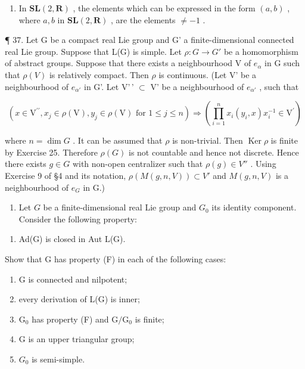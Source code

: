 \begin{enumerate}
\def\labelenumi{\arabic{enumi}.}
\setcounter{enumi}{35}
\tightlist
\item
  In \(\mathbf{SL}(2, \mathbf{R})\) , the elements which can be expressed in the form \((a, b)\) , where \(a, b\) in \(\mathbf{SL}(2, \mathbf{R})\) , are the elements \(\neq -1\) .
\end{enumerate}

¶ 37. Let G be a compact real Lie group and G' a finite-dimensional connected real Lie group. Suppose that L(G) is simple. Let \(\rho: G \to G'\) be a homomorphism of abstract groups. Suppose that there exists a neighbourhood V of \(e_{\alpha}\) in G such that \(\rho(V)\) is relatively compact. Then \(\rho\) is continuous. (Let V' be a neighbourhood of \(e_{\alpha'}\) in G'. Let V'\,' \(\subset\) V' be a neighbourhood of \(e_{\alpha'}\) , such that

\[
(x \in \mathrm{V} ^ {\prime \prime}, x _ {j} \in \rho (\mathrm{V}), y _ {j} \in \rho (\mathrm{V}) \text {   for   } 1 \leqslant j \leqslant n) \Rightarrow \left(\prod_ {i = 1} ^ {n} x _ {i} (y _ {i}, x) x _ {i} ^ {- 1} \in \mathrm{V} ^ {\prime}\right)
\]

where \(n = \dim G\) . It can be assumed that \(\rho\) is non-trivial. Then \(\operatorname{Ker} \rho\) is finite by Exercise 25. Therefore \(\rho(G)\) is not countable and hence not discrete. Hence there exists \(g \in G\) with non-open centralizer such that \(\rho(g) \in V''\) . Using Exercise 9 of §4 and its notation, \(\rho(M(g, n, V)) \subset V'\) and \(M(g, n, V)\) is a neighbourhood of \(e_G\) in G.)

\begin{enumerate}
\def\labelenumi{\arabic{enumi}.}
\setcounter{enumi}{37}
\tightlist
\item
  Let \(G\) be a finite-dimensional real Lie group and \(G_0\) its identity component. Consider the following property:
\end{enumerate}

\begin{enumerate}
\def\labelenumi{(\Alph{enumi})}
\setcounter{enumi}{5}
\tightlist
\item
  Ad(G) is closed in Aut L(G).
\end{enumerate}

Show that G has property (F) in each of the following cases:

\begin{enumerate}
\def\labelenumi{(\roman{enumi})}
\item
  G is connected and nilpotent;
\item
  every derivation of L(G) is inner;
\item
  \(\mathrm{G}_0\) has property (F) and \(\mathrm{G} / \mathrm{G}_0\) is finite;
\item
  G is an upper triangular group;
\item
  \(G_{0}\) is semi-simple.
\end{enumerate}

